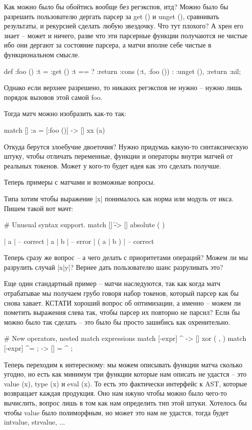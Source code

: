 
Как можно было бы обойтись вообще без регэкспов, итд?
Можно было бы разрешить пользователю дергать парсер за
get () и unget (), сравнивать результаты, и рекурсией сделать
любую звездочку.  Что тут плохого?  А хрен его знает -- может
и ничего, разве что эти парсерные функции получаются не чистые
ибо они дергают за состояние парсера, а матчи вполне себе чистые
в функциональном смысле.

def :foo () {
    :t = :get ()
    :t == \expr
        ? :return :cons (:t, :foo ())
        : :unget (), :return :nil;
}

Однако если верхнее разрешено, то никаких регэкспов не нужно -- 
нужно лишь порядок вызовов этой самой foo.

Тогда матч можно изобразить как-то так:

match [\expr]  :a = [:foo ()] -> [\expr] xx (a)

Откуда берутся злоебучие двоеточия?  Нужно придумаь какую-то
синтаксическую штуку, чтобы отличать переменные, функции и 
операторы внутри матчей от реальных токенов.  Может у кого-то
будет идея как это сделать получше.


Теперь примеры с матчами и возможные вопросы.


Типа хотим чтобы выражение |x| понималось как норма или модуль
от икса.  Пишем такой вот мачт:

# Unusual syntax support.
match [\expr] \| \expr \|
              -> [\expr] absolute (  )

| a |           -- correct
| a | b |       -- error
| ( a | b ) |   -- correct

Теперь сразу же вопрос -- а чего делать с приоритетами операций?
Можем ли мы разрулить случай |x|y|?  Вернее дать пользователю шанс
разруливать это?


Еще один стандартный пример -- матчи наследуются, так как когда
матч отрабатывае мы получаем грубо говоря набор токенов, который
парсер как бы снова хавает.  КСТАТИ хороший вопрос об оптимизации,
а именно -- можем ли пометить выражения слева так, чтобы парсер 
их повторно не парсил?  Если бы можно было так сделать -- это было
бы просто зашибись как охренительно.

# New operators, nested match expressions
match [\bin-expr] \primary ^ \primary   
                  ->  [\primary] xor ( ,  )
match [\assign-expr] \id ^= \expr ;
                  ->  [\assign]  = \id ^  ;



Теперь переходим к интересному:  мы можем описывать функции матча
сколько угодно, но есть как минимум три функции которые нам описать
не удастся -- это value (x), type (x) и eval (x).  То есть это 
фактически интерфейс к AST, которые возвращает каждая продукция.
Оно нам нжуно чтобы можно было чего-то вычислить, вопрос лишь в том
как нам определить тип этой штуки.  Хотелось бы чтобы value было
полиморфным, но может это нам не удастся, тогда будет intvalue, 
strvalue, ...

